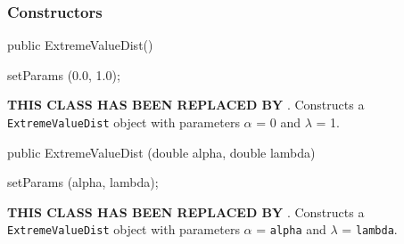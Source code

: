 \subsubsection* {Constructors}

\begin{code}

   public ExtremeValueDist()\begin{hide} {
      setParams (0.0, 1.0);
   }\end{hide}
\end{code}
  \begin{tabb}\textbf{THIS CLASS HAS BEEN REPLACED BY }.
   Constructs a \texttt{ExtremeValueDist} object with parameters
   $\alpha$ = 0 and $\lambda$ = 1.
   \end{tabb}
\begin{code}

   public ExtremeValueDist (double alpha, double lambda)\begin{hide} {
      setParams (alpha, lambda);
   }\end{hide}
\end{code}
  \begin{tabb}\textbf{THIS CLASS HAS BEEN REPLACED BY }.
   Constructs a \texttt{ExtremeValueDist} object with parameters
   $\alpha$ = \texttt{alpha} and $\lambda$ = \texttt{lambda}.
   \end{tabb}


